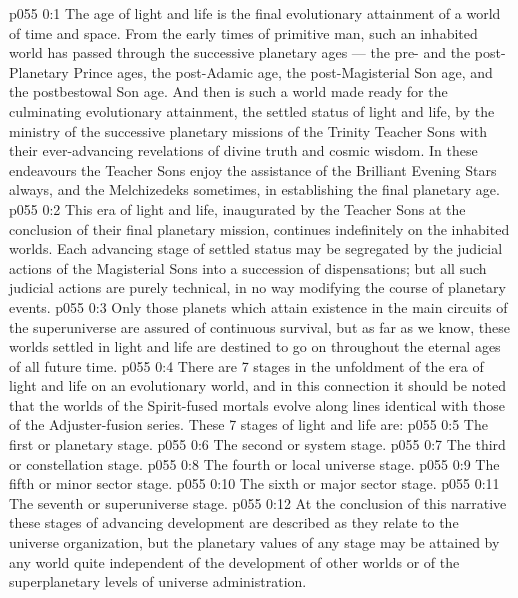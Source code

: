 \author{Mighty Messenger}
\vs p055 0:1 The age of light and life is the final evolutionary attainment of a world of time and space. From the early times of primitive man, such an inhabited world has passed through the successive planetary ages --- the pre\hyp{} and the post\hyp{}Planetary Prince ages, the post\hyp{}Adamic age, the post\hyp{}Magisterial Son age, and the postbestowal Son age. And then is such a world made ready for the culminating evolutionary attainment, the settled status of light and life, by the ministry of the successive planetary missions of the Trinity Teacher Sons with their ever\hyp{}advancing revelations of divine truth and cosmic wisdom. In these endeavours the Teacher Sons enjoy the assistance of the Brilliant Evening Stars always, and the Melchizedeks sometimes, in establishing the final planetary age.
\vs p055 0:2 This era of light and life, inaugurated by the Teacher Sons at the conclusion of their final planetary mission, continues indefinitely on the inhabited worlds. Each advancing stage of settled status may be segregated by the judicial actions of the Magisterial Sons into a succession of dispensations; but all such judicial actions are purely technical, in no way modifying the course of planetary events.
\vs p055 0:3 \pc Only those planets which attain existence in the main circuits of the superuniverse are assured of continuous survival, but as far as we know, these worlds settled in light and life are destined to go on throughout the eternal ages of all future time.
\vs p055 0:4 \pc There are 7 stages in the unfoldment of the era of light and life on an evolutionary world, and in this connection it should be noted that the worlds of the Spirit\hyp{}fused mortals evolve along lines identical with those of the Adjuster\hyp{}fusion series. These 7 stages of light and life are:
\vs p055 0:5 \bibnobreakspace The first or planetary stage.
\vs p055 0:6 \bibnobreakspace The second or system stage.
\vs p055 0:7 \bibnobreakspace The third or constellation stage.
\vs p055 0:8 \bibnobreakspace The fourth or local universe stage.
\vs p055 0:9 \bibnobreakspace The fifth or minor sector stage.
\vs p055 0:10 \bibnobreakspace The sixth or major sector stage.
\vs p055 0:11 \bibnobreakspace The seventh or superuniverse stage.
\vs p055 0:12 \pc At the conclusion of this narrative these stages of advancing development are described as they relate to the universe organization, but the planetary values of any stage may be attained by any world quite independent of the development of other worlds or of the superplanetary levels of universe administration.
